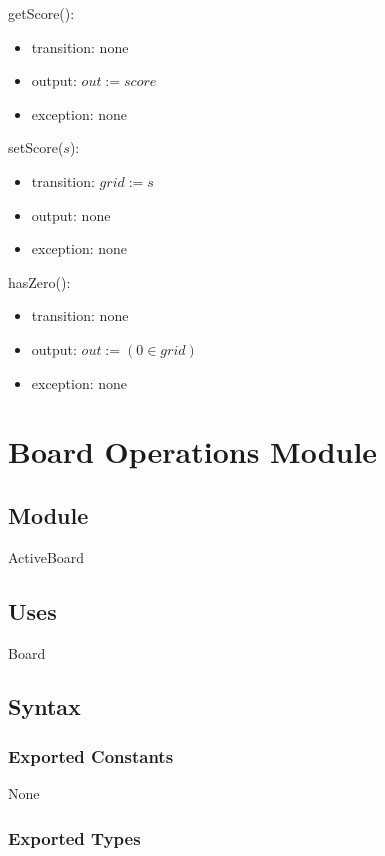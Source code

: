 \documentclass[12pt]{article}
\begin{document}
\noindent getScore():
\begin{itemize}
\item transition: none
\item output: $\mathit{out} := \mathit{score}$
\item exception: none
\end{itemize}

\noindent setScore($\mathit{s}$):
\begin{itemize}
\item transition: $\mathit{grid} := \mathit{s}$
\item output: none
\item exception: none
\end{itemize}

\noindent hasZero():
\begin{itemize}
\item transition: none
\item output: $\mathit{out} := (0 \in grid)$
\item exception: none
\end{itemize}

\newpage


\section* {Board Operations Module}

\subsection*{Module}

ActiveBoard

\subsection* {Uses}

Board

\subsection* {Syntax}

\subsubsection* {Exported Constants}

None

\subsubsection* {Exported Types}
\end{document}

